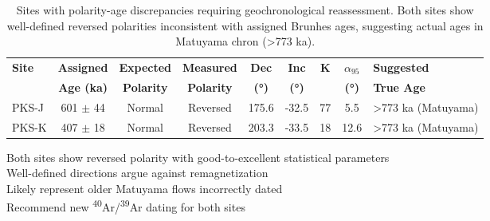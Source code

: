 \begin{table}[htbp]
    \centering
    \caption{Sites with polarity-age discrepancies requiring geochronological reassessment. Both sites show well-defined reversed polarities inconsistent with assigned Brunhes ages, suggesting actual ages in Matuyama chron (>773 ka).}
    \label{tab:age_problems}
    \footnotesize
    \begin{tabular}{|l|c|c|c|c|c|c|c|l|}
        \hline
        \textbf{Site} & \textbf{Assigned} & \textbf{Expected} & \textbf{Measured} & \textbf{Dec} & \textbf{Inc} & \textbf{K} & \textbf{$\alpha_{95}$} & \textbf{Suggested} \\
        & \textbf{Age (ka)} & \textbf{Polarity} & \textbf{Polarity} & \textbf{(°)} & \textbf{(°)} & & \textbf{(°)} & \textbf{True Age} \\
        \hline
        PKS-J & 601 $\pm$ 44 & Normal & Reversed & 175.6 & -32.5 & 77 & 5.5 & >773 ka (Matuyama) \\
        PKS-K & 407 $\pm$ 18 & Normal & Reversed & 203.3 & -33.5 & 18 & 12.6 & >773 ka (Matuyama) \\
        \hline
    \end{tabular}
    
    \vspace{0.5em}
    \raggedright
    \footnotesize
    Both sites show reversed polarity with good-to-excellent statistical parameters\\
    Well-defined directions argue against remagnetization\\
    Likely represent older Matuyama flows incorrectly dated\\
    Recommend new \textsuperscript{40}Ar/\textsuperscript{39}Ar dating for both sites
\end{table}

